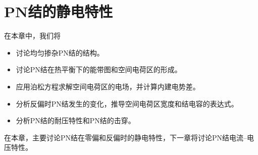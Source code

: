 \chapter{PN结的静电特性}

在本章中，我们将
\begin{itemize}
    \item 讨论均匀掺杂PN结的结构。
    \item 讨论PN结在热平衡下的能带图和空间电荷区的形成。
    \item 应用泊松方程求解空间电荷区的电场，并计算内建电势差。
    \item 分析反偏时PN结发生的变化，推导空间电荷区宽度和结电容的表达式。
    \item 分析PN结的耐压特性和PN结的击穿。
\end{itemize}
在本章，主要讨论PN结在零偏和反偏时的静电特性，下一章将讨论PN结电流--电压特性。




